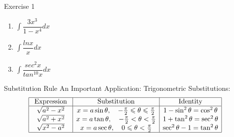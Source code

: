 \documentclass{beamer}
\begin{document}
\begin{frame}{Exercise 1}
    \begin{enumerate}
        \item$\int\dfrac{3x^3}{1-x^4}dx$
        \bigskip
        \item $\int\dfrac{ln x}{x}dx$
        \bigskip
        \item $\int\dfrac{sec^2 x}{tan^{10} x}dx$
    \end{enumerate}
\end{frame}


\begin{frame}{Substitution Rule}
An Important Application: Trigonometric Substitutions:
$$
\begin{aligned}
&\begin{array}{|c|c|c|}
\hline \text { Expression } & \text { Substitution } & \text { Identity } \\
\hline \sqrt{a^{2}-x^{2}} & x=a \sin \theta, \quad-\frac{\pi}{2} \leqslant \theta \leqslant \frac{\pi}{2} & 1-\sin ^{2} \theta=\cos ^{2} \theta \\
\sqrt{a^{2}+x^{2}} & x=a \tan \theta, \quad-\frac{\pi}{2}<\theta<\frac{\pi}{2} & 1+\tan ^{2} \theta=\sec ^{2} \theta \\
\sqrt{x^{2}-a^{2}} & x=a \sec \theta, \quad 0 \leqslant \theta<\frac{\pi}{2} & \sec ^{2} \theta-1=\tan ^{2} \theta \\
\hline
\end{array}
\end{aligned}
$$
\end{frame}
\end{document}
